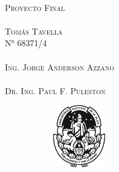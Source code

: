     \begin{titlepage}
        \begin{center}
            \vspace*{0.5cm}
            \Huge\scshape
            \color{white}
            \normalfont
            \\
            \vspace{0.5cm}
            \huge
            Proyecto Final                                       %
            \\
            \vspace{2cm}
            \Large\scshape
            \normalfont
            \\
            \large
            \vspace{0.2cm}
            Tomás Tavella
            \\
            N° 68371/4
            \\
            \vspace{1cm}
            \Large\scshape
            \normalfont
            \\
            \vspace{0.2cm}
            \large
            Ing. Jorge Anderson Azzano
            \\
            \vspace{0.3cm}
            \Large\scshape
            \normalfont
            \\
            \vspace{0.2cm}
            \large
            Dr. Ing. Paul F. Puleston
            \\
            \vfill
            \begin{figure}[H]
                \centering
                \begin{subfigure}
                    \centering
                    \includegraphics[width=0.25\textwidth]{Imagenes/UNLP.pdf}

\end{subfigure}
\end{figure}
\end{center}
\end{titlepage}
